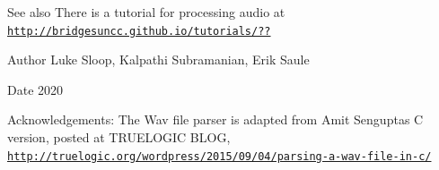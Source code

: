 \begin{DoxySeeAlso}{See also}
There is a tutorial for processing audio at \href{http://bridgesuncc.github.io/tutorials/??}{\tt http\+://bridgesuncc.\+github.\+io/tutorials/??}
\end{DoxySeeAlso}
\begin{DoxyAuthor}{Author}
Luke Sloop, Kalpathi Subramanian, Erik Saule 
\end{DoxyAuthor}
\begin{DoxyDate}{Date}
2020
\end{DoxyDate}
Acknowledgements\+: The Wav file parser is adapted from Amit Sengupta\textquotesingle{}s C version, posted at T\+R\+U\+E\+L\+O\+G\+IC B\+L\+OG, \href{http://truelogic.org/wordpress/2015/09/04/parsing-a-wav-file-in-c/}{\tt http\+://truelogic.\+org/wordpress/2015/09/04/parsing-\/a-\/wav-\/file-\/in-\/c/}

